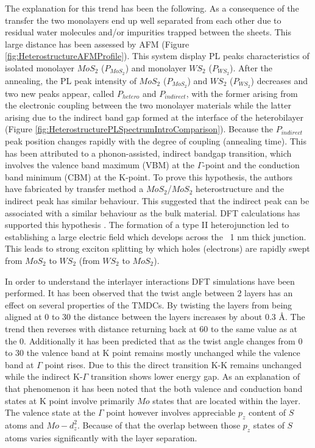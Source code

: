 The explanation for this trend has been the following. As a consequence of the transfer the two monolayers end up well separated from each other due to residual water molecules and/or impurities trapped between the sheets. This large distance has been assessed by AFM (Figure \ref{fig:HeterostructureAFMProfile}). This system display PL peaks characteristics of isolated monolayer $MoS_2$ ($P_{MoS_2}$) and monolayer $WS_2$ ($P_{WS_2}$). After the annealing, the PL peak intensity of $MoS_2$ ($P_{MoS_2}$) and $WS_2$ ($P_{WS_2}$) decreases and two new peaks appear, called $P_{hetero}$ and $P_{indirect}$, with the former arising from the electronic coupling between the two monolayer materials while the latter arising due to the indirect band gap formed at the interface of the heterobilayer (Figure \ref{fig:HeterostructurePLSpectrumIntroComparison}). Because the $P_{indirect}$ peak position changes rapidly with the degree of coupling (annealing time). This has been attributed to a phonon-assisted, indirect bandgap transition, which involves the valence band maximum (VBM) at the {$\Gamma$}-point and the conduction band minimum (CBM) at the K-point. To prove this hypothesis, the authors have fabricated by transfer method a $MoS_2$/$MoS_2$ heterostructure and the indirect peak has similar behaviour. This suggested that the indirect peak can be associated with a similar behaviour as the bulk material. DFT calculations has supported this hypothesis \cite{Zande2014}. The formation of a type II heterojunction led to establishing a large electric field which develops across the ~1 nm thick junction. This leads to strong exciton splitting by which holes (electrons) are rapidly swept from $MoS_2$ to $WS_2$ (from $WS_2$  to $MoS_2$).

In order to understand the interlayer interactions DFT simulations have been performed. It has been observed that the twist angle between 2 layers has an effect on several properties of the TMDCs. By twisting the layers from being aligned at 0{\degree} to 30{\degree} the distance between the layers increases by about 0.3 \r{A}. The trend then reverses with distance returning back at 60 {\degree} to the same value as at the 0{\degree}. Additionally it has been predicted that as the twist angle changes from 0{\degree} to 30{\degree} the valence band at K point remains mostly unchanged while the valence band at $\Gamma$ point rises. Due to this the direct transition K-K remains unchanged while the indirect K-$\Gamma$ transition shows lower energy gap. As an explanation of that phenomenon it has been noted that the both valence and conduction band states at K point involve primarily $Mo$ states that are located within the layer. The valence state at the $\Gamma$ point however involves appreciable $p_z$ content of $S$ atoms and $Mo-d_z^2$. Because of that the overlap between those $p_z$ states of $S$ atoms varies significantly with the layer separation.

